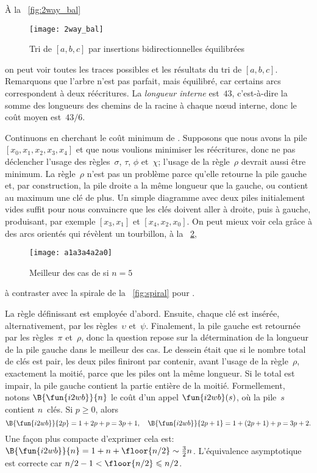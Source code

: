 À la \fig~\vref{fig:2way_bal}
\begin{figure}
\centering
\texttt{[image: 2way\_bal]}
\caption{Tri de \([a,b,c]\) par insertions bidirectionnelles
  équilibrées\label{fig:2way_bal}}
\end{figure}
on peut voir toutes les traces possibles et les résultats du tri de \([a,b,c]\). Remarquons que
l'arbre n'est pas parfait, mais équilibré,
car certains arcs correspondent à deux réécritures. La \emph{longueur
  interne}\label{insertion__internal_path_length}  est~\(43\), c'est-à-dire la somme des
longueurs des chemins de la racine à chaque n{\oe}ud interne, donc le
coût moyen est~\(43/6\).


Continuons en cherchant le coût minimum de . Supposons que
nous avons la pile \([x_0, x_1, x_2, x_3, x_4]\) et que nous voulions
minimiser les réécritures, donc ne pas déclencher l'usage des
règles~\(\sigma\), \(\tau\), \(\phi\) et~\(\chi\); l'usage de la
règle~\(\rho\) devrait aussi être minimum. La règle~\(\rho\) n'est pas
un problème parce qu'elle retourne la pile gauche et, par
construction, la pile droite a la même longueur que la gauche, ou
contient au maximum une clé de plus. Un simple diagramme avec deux
piles initialement vides suffit pour nous convaincre que les clés
doivent aller à droite, puis à gauche, produisant, par exemple \([x_3
, x_1]\) et \([x_4, x_2, x_0]\). On peut mieux voir cela grâce à des
arcs orientés qui révèlent un tourbillon, à la
\fig~\ref{fig:whirlpool},
\begin{figure}[b]
\centering
\texttt{[image: a1a3a4a2a0]}
\caption{Meilleur des cas de  si \(n=5\)
\label{fig:whirlpool}}
\end{figure}
à contraster avec la spirale de la \fig~\vref{fig:spiral} pour
.

La règle définissant  est employée d'abord. Ensuite, chaque
clé est insérée, alternativement, par les règles~\(\upsilon\)
et~\(\psi\). Finalement, la pile gauche est retournée par les
règles~\(\pi\) et~\(\rho\), donc la question repose sur la
détermination de la longueur de la pile gauche dans le meilleur des
cas. Le dessein était que si le nombre total de clés est pair, les
deux piles finiront par contenir, avant l'usage de la règle~\(\rho\),
exactement la moitié, parce que les piles ont la même longueur. Si le
total est impair, la pile gauche contient la partie entière de la
moitié. Formellement, notons \(\B{\fun{i2wb}}{n}\) le coût d'un appel
\(\fun{i2wb}(s)\), où la pile~\(s\) contient \(n\)~clés. Si \(p
\geqslant 0\), alors
\begin{equation*}
\B{\fun{i2wb}}{2p}   = 1 +     2p + p = 3p + 1,\quad
\B{\fun{i2wb}}{2p+1} = 1 + (2p+1) + p = 3p + 2.
\end{equation*}
Une façon plus compacte d'exprimer cela est: \(\B{\fun{i2wb}}{n} = 1 +
n + \floor{n/2} \sim \tfrac{3}{2}{n}\). L'équivalence asymptotique est
correcte car \(n/2-1 < \floor{n/2} \leqslant n/2\).

